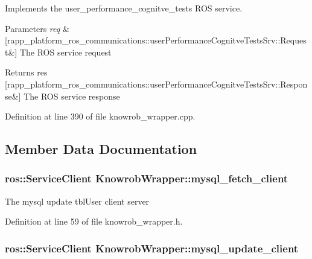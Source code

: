 Implements the user\-\_\-performance\-\_\-cognitve\-\_\-tests R\-O\-S service. 


\begin{DoxyParams}{Parameters}
{\em req} & \mbox{[}rapp\-\_\-platform\-\_\-ros\-\_\-communications\-::user\-Performance\-Cognitve\-Tests\-Srv\-::\-Request\&\mbox{]} The R\-O\-S service request \\
\hline
\end{DoxyParams}
\begin{DoxyReturn}{Returns}
res \mbox{[}rapp\-\_\-platform\-\_\-ros\-\_\-communications\-::user\-Performance\-Cognitve\-Tests\-Srv\-::\-Response\&\mbox{]} The R\-O\-S service response 
\end{DoxyReturn}


Definition at line 390 of file knowrob\-\_\-wrapper.\-cpp.



\subsection{Member Data Documentation}
\hypertarget{classKnowrobWrapper_aaa8ac92e0387787a4ba8bdc9a5886c4d}{
\subsubsection[{mysql\-\_\-fetch\-\_\-client}]{\setlength{\rightskip}{0pt plus 5cm}ros\-::\-Service\-Client Knowrob\-Wrapper\-::mysql\-\_\-fetch\-\_\-client\hspace{0.3cm}{\ttfamily [private]}}}\label{classKnowrobWrapper_aaa8ac92e0387787a4ba8bdc9a5886c4d}
The mysql update tbl\-User client server 

Definition at line 59 of file knowrob\-\_\-wrapper.\-h.

\hypertarget{classKnowrobWrapper_a16a7e3854cd229eabb1675eded4bafb4}{
\subsubsection[{mysql\-\_\-update\-\_\-client}]{\setlength{\rightskip}{0pt plus 5cm}ros\-::\-Service\-Client Knowrob\-Wrapper\-::mysql\-\_\-update\-\_\-client\hspace{0.3cm}{\ttfamily [private]}}}\label{classKnowrobWrapper_a16a7e3854cd229eabb1675eded4bafb4}


